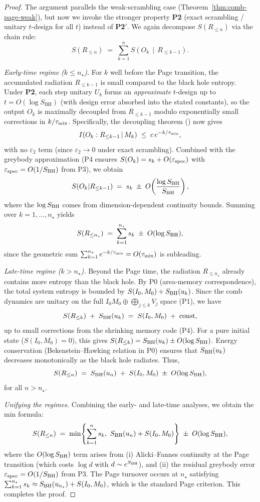 \documentclass[aps,prd,preprint,onecolumn,superscriptaddress,nofootinbib,longbibliography,floatfix,11pt,showpacs,showkeys]{revtex4-2}
\newcommand{\Ptwo}{\textbf{P2}\xspace}
\newcommand{\PtwoPrime}{\textbf{P2$'$}\xspace}
\newcommand{\SBH}{\ensuremath{S_{\mathrm{BH}}}}
\theoremstyle{plain}
\theoremstyle{definition}
\theoremstyle{remark}
\begin{document}
\begin{proof}
The argument parallels the weak-scrambling case (Theorem~\ref{thm:comb-page-weak}), but now we invoke the stronger property \Ptwo{} (exact scrambling / unitary $t$-design for all $t$) instead of \PtwoPrime. We again decompose $S(R_{\le n})$ via the chain rule:
\[
S(R_{\le n}) \;=\; \sum_{k=1}^n S\!\left(O_k \,\middle|\, R_{\le k-1}\right).
\]

\emph{Early-time regime ($k\le n_\star$).}
For $k$ well before the Page transition, the accumulated radiation $R_{\le k-1}$ is small compared to the black hole entropy. Under \Ptwo{}, each step unitary $U_k$ forms an \emph{approximate} $t$-design up to $t = O(\log \SBH)$ (with design error absorbed into the stated constants), so the output $O_k$ is maximally decoupled from $R_{\le k-1}$ modulo exponentially small corrections in $k/\tau_{\rm mix}$. Specifically, the decoupling theorem () now gives
\[
I\!\left(O_k:R_{\le k-1}\,|\,M_k\right) \;\le\; c\,e^{-k/\tau_{\rm mix}},
\]
with no $\varepsilon_2$ term (since $\varepsilon_2\to0$ under exact scrambling). Combined with the greybody approximation (P4 ensures $S(O_k)=s_k+O(\varepsilon_{\rm spec})$ with $\varepsilon_{\rm spec}=O(1/S_{\rm BH})$ from P3), we obtain
\[
S(O_k|R_{\le k-1}) \;=\; s_k \;\pm\; O\!\left(\frac{\log S_{\rm BH}}{S_{\rm BH}}\right),
\]
where the $\log S_{\rm BH}$ comes from dimension-dependent continuity bounds. Summing over $k=1,\ldots,n_\star$ yields
\[
S(R_{\le n_\star}) \;=\; \sum_{k=1}^{n_\star} s_k \;\pm\; O(\log S_{\rm BH}),
\]
since the geometric sum $\sum_{k=1}^{n_\star} e^{-k/\tau_{\rm mix}}=O(\tau_{\rm mix})$ is subleading.

\emph{Late-time regime ($k> n_\star$).}
Beyond the Page time, the radiation $R_{\le n_\star}$ already contains more entropy than the black hole. By P0 (area-memory correspondence), the total system entropy is bounded by $S(I_0,M_0)+S_{\rm BH}(u_k)$. Since the comb dynamics are unitary on the full $I_0M_0\oplus \bigoplus_{j\le k} V_j$ space (P1), we have
\[
S(R_{\le k}) \;+\; S_{\rm BH}(u_k) \;=\; S(I_0,M_0) \;+\; \text{const},
\]
up to small corrections from the shrinking memory code (P4). For a pure initial state ($S(I_0,M_0)=0$), this gives $S(R_{\le k})=S_{\rm BH}(u_k)\pm O(\log S_{\rm BH})$. Energy conservation (Bekenstein--Hawking relation in P0) ensures that $S_{\rm BH}(u_k)$ decreases monotonically as the black hole radiates. Thus,
\[
S(R_{\le n}) \;=\; S_{\rm BH}(u_n) \;+\; S(I_0,M_0) \;\pm\; O(\log S_{\rm BH}),
\]
for all $n>n_\star$.

\emph{Unifying the regimes.}
Combining the early- and late-time analyses, we obtain the min formula:
\[
S(R_{\le n}) \;=\; \min\!\left\{\sum_{k=1}^n s_k,\ S_{\rm BH}(u_n)+S(I_0,M_0)\right\} \;\pm\; O(\log S_{\rm BH}),
\]
where the $O(\log S_{\rm BH})$ term arises from (i) Alicki--Fannes continuity at the Page transition (which costs $\log d$ with $d\sim e^{S_{\rm BH}}$), and (ii) the residual greybody error $\varepsilon_{\rm spec}=O(1/S_{\rm BH})$ from P3. The Page turnover occurs at $n_\star$ satisfying $\sum_{k=1}^{n_\star} s_k \approx S_{\rm BH}(u_{n_\star})+S(I_0,M_0)$, which is the standard Page criterion. This completes the proof.
\end{proof}
\end{document}
